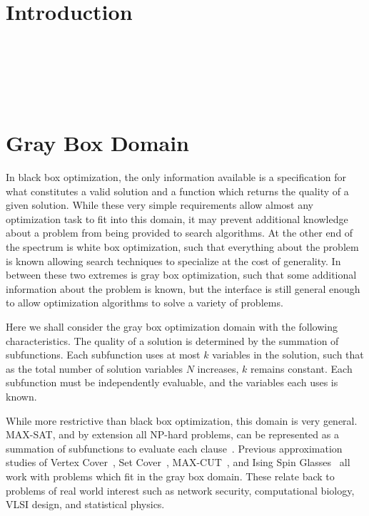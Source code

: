 \documentclass{sig-alternate}
\begin{document}
\section{Introduction}
~\cite{chen:2011:memetic}

~\cite{whitley:2013:greedy}~\cite{chicano:2014:ball}

~\cite{goldman:2014:p3}

\section{Gray Box Domain}
\label{sec-gray-box}
In black box optimization, the only information available is a specification
for what constitutes a valid solution and a function which returns the quality
of a given solution. While these very simple requirements allow almost any
optimization task to fit into this domain, it may prevent additional knowledge
about a problem from being provided to search algorithms. At the other end of
the spectrum is white box optimization, such that everything about the problem
is known allowing search techniques to specialize at the cost of generality.
In between these two extremes is gray box optimization, such that some additional
information about the problem is known, but the interface is still general enough
to allow optimization algorithms to solve a variety of problems.

Here we shall consider the gray box optimization domain with the following
characteristics. The quality of a solution is determined by the summation
of subfunctions. Each subfunction uses at most $k$ variables in the solution,
such that as the total number of solution variables $N$ increases, $k$ remains constant.
Each subfunction must be independently evaluable, and the variables each uses is known.

While more restrictive than black box optimization, this domain is very general.
MAX-SAT, and by extension all NP-hard problems, can be represented
as a summation of subfunctions to evaluate each clause~\cite{whitley:2013:greedy}.
Previous approximation studies of Vertex Cover~\cite{oliveto:2009:vertexcover},
Set Cover~\cite{yu:2010:setcover}, MAX-CUT~\cite{festa:2002:maxcut}, and
Ising Spin Glasses~\cite{pelikan:2003:hboaising} all work with problems which fit
in the gray box domain. These relate back to problems of real world interest such
as network security, computational biology, VLSI design, and statistical physics.
\end{document}
